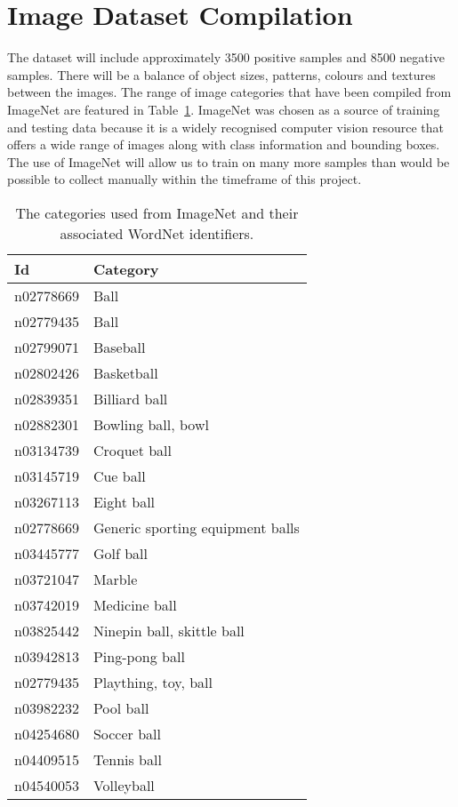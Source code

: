\documentclass{llncs}
\begin{document}
    \section{Image Dataset Compilation} {
    \label{sec:dataset}

        The dataset will include approximately 3500 positive samples and 8500 negative samples. There will be a balance of object sizes, patterns, colours and textures between the images. The range of image categories that have been compiled from ImageNet are featured in Table~\ref{tab:imagenet}. ImageNet was chosen as a
        source of training and testing data because it is a widely recognised computer vision resource that offers a wide range of images along with class information and bounding boxes. The use of ImageNet will allow us to train on many more samples than would be possible to collect manually within the timeframe of this project.

        \begin{table}[h]
        \centering
        \caption{The categories used from ImageNet and their associated WordNet \citep{fellbaum1998wordnet} identifiers.}
        \label{tab:imagenet}
        \begin{tabularx}{\textwidth}{lX}
            \toprule
            \textbf{Id} & \textbf{Category} \\
            \midrule
            n02778669 & Ball \\
            n02779435 & Ball \\
            n02799071 & Baseball \\
            n02802426 & Basketball \\
            n02839351 & Billiard ball \\
            n02882301 & Bowling ball, bowl \\
            n03134739 & Croquet ball \\
            n03145719 & Cue ball \\
            n03267113 & Eight ball \\
            n02778669 & Generic sporting equipment balls \\
            n03445777 & Golf ball \\
            n03721047 & Marble \\
            n03742019 & Medicine ball \\
            n03825442 & Ninepin ball, skittle ball \\
            n03942813 & Ping-pong ball \\
            n02779435 & Plaything, toy, ball \\
            n03982232 & Pool ball \\
            n04254680 & Soccer ball \\
            n04409515 & Tennis ball \\
            n04540053 & Volleyball \\
            \bottomrule
        \end{tabularx}
        \end{table}

    }
\end{document}
